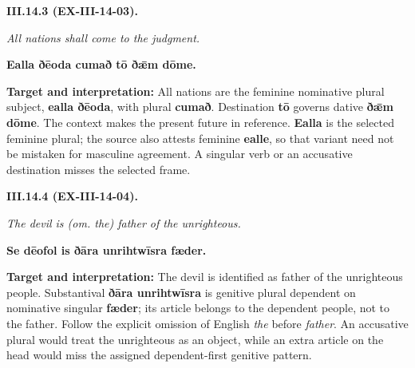 \par\begin{minipage}{\linewidth}\raggedright
\textbf{III.14.3 (EX-III-14-03).}

\emph{All nations shall come to the judgment.}

\textbf{Ealla ðēoda cumað tō ðǣm dōme.}

\textbf{Target and interpretation:} All nations are the feminine nominative plural subject, \textbf{ealla ðēoda}, with plural \textbf{cumað}. Destination \textbf{tō} governs dative \textbf{ðǣm dōme}. The context makes the present future in reference. \textbf{Ealla} is the selected feminine plural; the source also attests feminine \textbf{ealle}, so that variant need not be mistaken for masculine agreement. A singular verb or an accusative destination misses the selected frame.

\end{minipage}\par\addvspace{4pt}

\par\begin{minipage}{\linewidth}\raggedright
\textbf{III.14.4 (EX-III-14-04).}

\emph{The devil is (om. the) father of the unrighteous.}

\textbf{Se dēofol is ðāra unrihtwīsra fæder.}

\textbf{Target and interpretation:} The devil is identified as father of the unrighteous people. Substantival \textbf{ðāra unrihtwīsra} is genitive plural dependent on nominative singular \textbf{fæder}; its article belongs to the dependent people, not to the father. Follow the explicit omission of English \emph{the} before \emph{father}. An accusative plural would treat the unrighteous as an object, while an extra article on the head would miss the assigned dependent-first genitive pattern.

\end{minipage}\par\addvspace{4pt}

